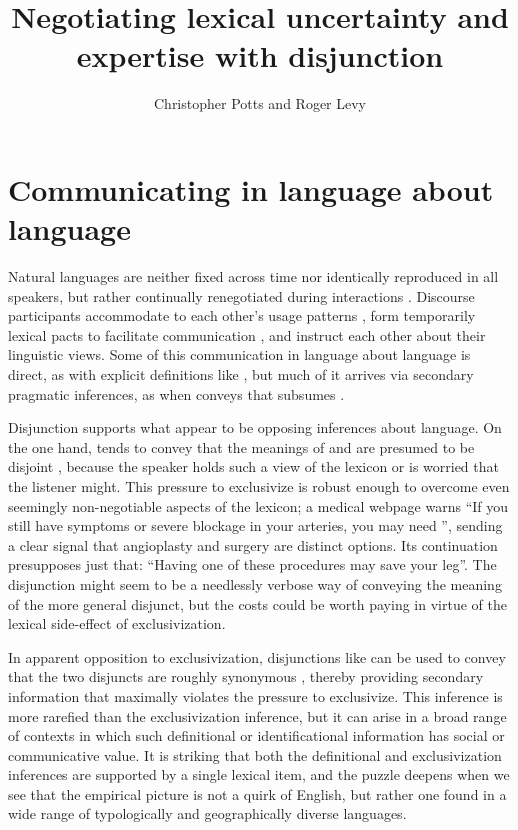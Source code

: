 \documentclass{article}
\begin{document}

\title{Negotiating lexical uncertainty and expertise with disjunction}
\author{Christopher Potts and Roger Levy}
\maketitle


\section{Communicating in language about language}\label{sec:introduction}

Natural languages are neither fixed across time nor identically
reproduced in all speakers, but rather continually renegotiated during
interactions \citep{Clark97}. Discourse participants accommodate to
each other's usage patterns \citep{Giles:Coupland:Coupland:1991}, form
temporarily lexical pacts to facilitate communication
\citep{Clark:Wilkes-Gibbs:1986,Brennan:Clark:1996}, and instruct each
other about their linguistic views. Some of this communication in
language about language is direct, as with explicit definitions like
, but much of it arrives via
secondary pragmatic inferences, as when  conveys
that  subsumes  \citep{Hearst92,SnowEtAl05}.

Disjunction supports what appear to be opposing inferences about
language. On the one hand,  tends to convey that the
meanings of  and  are presumed to be disjoint
\citep{Hurford:1974}, because the speaker holds such a view of the
lexicon or is worried that the listener might. This pressure to
exclusivize is robust enough to overcome even seemingly non-negotiable
aspects of the lexicon; a medical webpage warns ``If you still have
symptoms or severe blockage in your arteries, you may need
'', sending a clear signal that
angioplasty and surgery are distinct options. Its continuation
presupposes just that: ``Having one of these procedures may save your
leg''. The disjunction might seem to be a needlessly verbose way of
conveying the meaning of the more general disjunct, but the costs
could be worth paying in virtue of the lexical side-effect of
exclusivization.

In apparent opposition to exclusivization, disjunctions like
 can be used to convey that the two
disjuncts are roughly synonymous \citep{Horn89}, thereby providing
secondary information that maximally violates the pressure to
exclusivize. This inference is more rarefied than the exclusivization
inference, but it can arise in a broad range of contexts in which such
definitional or identificational information has social or
communicative value. It is striking that both the definitional and
exclusivization inferences are supported by a single lexical item, and
the puzzle deepens when we see that the empirical picture is not a
quirk of English, but rather one found in a wide range of
typologically and geographically diverse languages.
\end{document}
